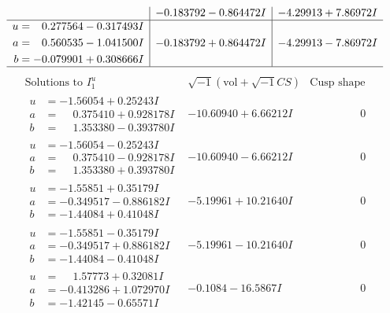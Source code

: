 \documentclass[1p]{elsarticle_modified}
\theoremstyle{definition}
\newcommand{\I}{\sqrt{-1}}
\begin{document}
$$\begin{array}{c|c|c}
 & -0.183792 - 0.864472 I & -4.29913 + 7.86972 I \\ \hline\begin{aligned}
u &= \phantom{-}0.277564 - 0.317493 I \\
a &= \phantom{-}0.560535 - 1.041500 I \\
b &= -0.079901 + 0.308666 I\end{aligned}
 & -0.183792 + 0.864472 I & -4.29913 - 7.86972 I\\
 \hline 
 \end{array}$$\newpage$$\begin{array}{c|c|c}  
\text{Solutions to }I^u_{1}& \I (\text{vol} + \sqrt{-1}CS) & \text{Cusp shape}\\
 \hline 
\begin{aligned}
u &= -1.56054 + 0.25243 I \\
a &= \phantom{-}0.375410 + 0.928178 I \\
b &= \phantom{-}1.353380 - 0.393780 I\end{aligned}
 & -10.60940 + 6.66212 I & \phantom{-0.000000 } 0 \\ \hline\begin{aligned}
u &= -1.56054 - 0.25243 I \\
a &= \phantom{-}0.375410 - 0.928178 I \\
b &= \phantom{-}1.353380 + 0.393780 I\end{aligned}
 & -10.60940 - 6.66212 I & \phantom{-0.000000 } 0 \\ \hline\begin{aligned}
u &= -1.55851 + 0.35179 I \\
a &= -0.349517 - 0.886182 I \\
b &= -1.44084 + 0.41048 I\end{aligned}
 & -5.19961 + 10.21640 I & \phantom{-0.000000 } 0 \\ \hline\begin{aligned}
u &= -1.55851 - 0.35179 I \\
a &= -0.349517 + 0.886182 I \\
b &= -1.44084 - 0.41048 I\end{aligned}
 & -5.19961 - 10.21640 I & \phantom{-0.000000 } 0 \\ \hline\begin{aligned}
u &= \phantom{-}1.57773 + 0.32081 I \\
a &= -0.413286 + 1.072970 I \\
b &= -1.42145 - 0.65571 I\end{aligned}
 & -0.1084 - 16.5867 I & \phantom{-0.000000 } 0 \\ \hline\begin{aligned}

\end{aligned}
\end{array}$$
\end{document}
